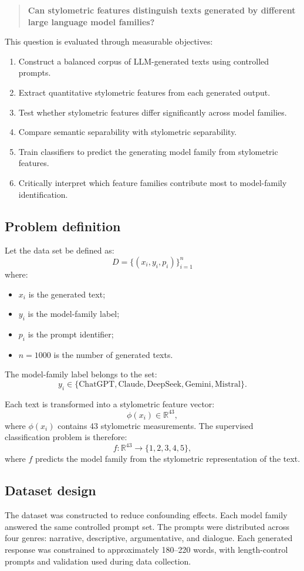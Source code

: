 \begin{quote}
\textbf{Can stylometric features distinguish texts generated by different large language model families?}
\end{quote}

This question is evaluated through measurable objectives:
\begin{enumerate}
  \item Construct a balanced corpus of LLM-generated texts using controlled prompts.
  \item Extract quantitative stylometric features from each generated output.
  \item Test whether stylometric features differ significantly across model families.
  \item Compare semantic separability with stylometric separability.
  \item Train classifiers to predict the generating model family from stylometric features.
  \item Critically interpret which feature families contribute most to model-family identification.
\end{enumerate}

\subsection{Problem definition}
Let the data set be defined as:
\[
D = \{(x_i, y_i, p_i)\}_{i=1}^{n}
\]
where:
\begin{itemize}
  \item $x_i$ is the generated text;
  \item $y_i$ is the model-family label;
  \item $p_i$ is the prompt identifier;
  \item $n = 1000$ is the number of generated texts.
\end{itemize}

The model-family label belongs to the set:
\[
 y_i \in \{\text{ChatGPT}, \text{Claude}, \text{DeepSeek}, \text{Gemini}, \text{Mistral}\}.
\]

Each text is transformed into a stylometric feature vector:
\[
\phi(x_i) \in \mathbb{R}^{43},
\]
where $\phi(x_i)$ contains 43 stylometric measurements. The supervised classification problem is therefore:
\[
 f: \mathbb{R}^{43} \rightarrow \{1,2,3,4,5\},
\]
where $f$ predicts the model family from the stylometric representation of the text.

\subsection{Dataset design}
The dataset was constructed to reduce confounding effects. Each model family answered the same controlled prompt set. The prompts were distributed across four genres: narrative, descriptive, argumentative, and dialogue. Each generated response was constrained to approximately 180--220 words, with length-control prompts and validation used during data collection.

